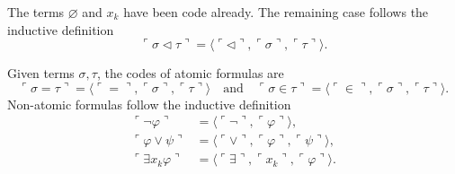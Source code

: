 \begin{definition}
    \label{def:Code.Term}
    \leanok
    The terms $\varnothing$ and $x_k$ have been code already. 
    The remaining case follows the inductive definition
    $$
    \ulcorner{\sigma \lhd \tau}\urcorner = 
    \langle\ulcorner{\lhd}\urcorner, \ulcorner{\sigma}\urcorner, \ulcorner{\tau}\urcorner \rangle.
    $$
\end{definition}

\begin{definition}
    \label{def:Code.Formula}
    \leanok
    Given terms $\sigma, \tau$, the codes of atomic formulas are
    $$
    \ulcorner{\sigma = \tau}\urcorner = 
    \langle\ulcorner{=}\urcorner, \ulcorner{\sigma}\urcorner, \ulcorner{\tau}\urcorner \rangle
    \quad \text{and} \quad
    \ulcorner{\sigma \in \tau}\urcorner = 
    \langle\ulcorner{\in}\urcorner, \ulcorner{\sigma}\urcorner, \ulcorner{\tau}\urcorner \rangle.
    $$
    Non-atomic formulas follow the inductive definition
    $$
    \begin{aligned}
        \ulcorner{\neg\varphi}\urcorner & = 
        \langle\ulcorner{\neg}\urcorner, \ulcorner{\varphi}\urcorner \rangle, \\
        \ulcorner{\varphi \lor \psi}\urcorner & = 
        \langle\ulcorner{\lor}\urcorner, \ulcorner{\varphi}\urcorner, 
        \ulcorner{\psi}\urcorner \rangle, \\
        \ulcorner{\exists x_k \varphi}\urcorner & = 
        \langle\ulcorner{\exists}\urcorner, \ulcorner{x_k}\urcorner, 
        \ulcorner{\varphi}\urcorner \rangle.
    \end{aligned}
    $$
\end{definition}

